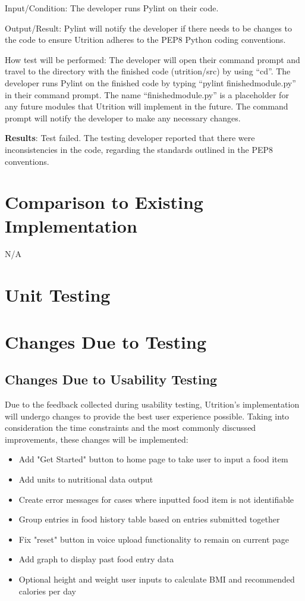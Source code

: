 \documentclass[12pt, titlepage]{article}
\begin{document}
\begin{enumerate}
		Input/Condition: The developer runs Pylint on their code.
		
		Output/Result: Pylint will notify the developer if there needs to be changes to the code to ensure Utrition adheres to the PEP8 Python coding conventions.
		
		How test will be performed: The developer will open their command prompt and travel to the directory with the finished code (utrition/src) by using “cd”. The developer runs Pylint on the finished code by typing “pylint finishedmodule.py” in their command prompt. The name “finishedmodule.py” is a placeholder for any future modules that Utrition will implement in the future. The command prompt will notify the developer to make any necessary changes.
		
		\textbf{Results}: Test failed. The testing developer reported that there were inconsistencies in the code, regarding the standards outlined in the PEP8 conventions.
		
		
	\end{enumerate}
	
	\section{Comparison to Existing Implementation}	
	
	N/A
	
	\section{Unit Testing}
	
	\section{Changes Due to Testing}
	\subsection{Changes Due to Usability Testing}
	Due to the feedback collected during usability testing, Utrition's implementation will undergo changes to provide the best user experience possible. Taking into consideration the time constraints and the most commonly discussed improvements, these changes will be implemented:
	\begin{itemize}
		\item Add "Get Started" button to home page to take user to input a food item
		\item Add units to nutritional data output
		\item Create error messages for cases where inputted food item is not identifiable 
		\item Group entries in food history table based on entries submitted together
		\item Fix "reset" button in voice upload functionality to remain on current page
		\item Add graph to display past food entry data
		\item Optional height and weight user inputs to calculate BMI and recommended calories per day 
	\end{itemize}
\end{document}
